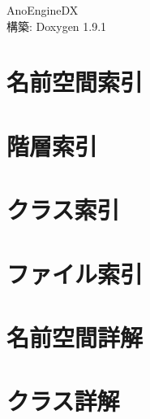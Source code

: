 \let\mypdfximage\pdfximage\def\pdfximage{\immediate\mypdfximage}\documentclass[twoside]{book}
\newcommand{\+}{\discretionary{\mbox{\scriptsize$\hookleftarrow$}}{}{}}
\newcommand{\clearemptydoublepage}{%
  \newpage{\pagestyle{empty}\cleardoublepage}%
}
\begin{document}
\raggedbottom
\begin{CJK}{UTF8}{min}

\hypersetup{pageanchor=false,
             bookmarksnumbered=true,
             pdfencoding=unicode
            }
\begin{titlepage}
\vspace*{7cm}
\begin{center}%
{\Large Ano\+Engine\+DX }\\
\vspace*{1cm}
{\large 構築\+: Doxygen 1.9.1}\\
\end{center}
\end{titlepage}
\clearemptydoublepage
{}
\tableofcontents
\clearemptydoublepage
{}
\hypersetup{pageanchor=true}

\chapter{名前空間索引}

\chapter{階層索引}

\chapter{クラス索引}

\chapter{ファイル索引}

\chapter{名前空間詳解}


\chapter{クラス詳解}






























\end{CJK}
\end{document}
